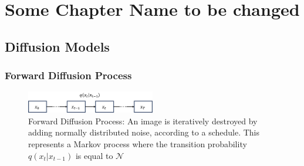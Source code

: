 \chapter{Some Chapter Name to be changed}

\section{Diffusion Models}
\subsection{Forward Diffusion Process}

\begin{figure}[h]
    \centering
    \includegraphics[width=0.5\textwidth]{img/forward_diffusion.png}
    \caption{Forward Diffusion Process: An image is iteratively destroyed by adding normally distributed noise, 
    according to a schedule. This represents a Markov process where the transition probability $q(x_t|x_{t-1})$ 
    is equal to $\mathcal{N}$}
    \label{fig:forward_diffusion}
\end{figure}